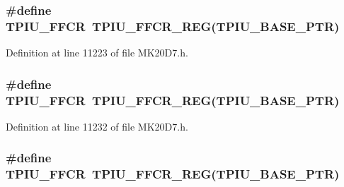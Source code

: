 \subsubsection[{\texorpdfstring{T\+P\+I\+U\+\_\+\+F\+F\+CR}{TPIU_FFCR}}]{\setlength{\rightskip}{0pt plus 5cm}\#define T\+P\+I\+U\+\_\+\+F\+F\+CR~{\bf T\+P\+I\+U\+\_\+\+F\+F\+C\+R\+\_\+\+R\+EG}({\bf T\+P\+I\+U\+\_\+\+B\+A\+S\+E\+\_\+\+P\+TR})}\hypertarget{group___t_p_i_u___register___accessor___macros_gac8a5a5f384ba44b32ca65e20ed86745b}{}\label{group___t_p_i_u___register___accessor___macros_gac8a5a5f384ba44b32ca65e20ed86745b}


Definition at line 11223 of file M\+K20\+D7.\+h.

\subsubsection[{\texorpdfstring{T\+P\+I\+U\+\_\+\+F\+F\+CR}{TPIU_FFCR}}]{\setlength{\rightskip}{0pt plus 5cm}\#define T\+P\+I\+U\+\_\+\+F\+F\+CR~{\bf T\+P\+I\+U\+\_\+\+F\+F\+C\+R\+\_\+\+R\+EG}({\bf T\+P\+I\+U\+\_\+\+B\+A\+S\+E\+\_\+\+P\+TR})}\hypertarget{group___t_p_i_u___register___accessor___macros_gac8a5a5f384ba44b32ca65e20ed86745b}{}\label{group___t_p_i_u___register___accessor___macros_gac8a5a5f384ba44b32ca65e20ed86745b}


Definition at line 11232 of file M\+K20\+D7.\+h.

\subsubsection[{\texorpdfstring{T\+P\+I\+U\+\_\+\+F\+F\+CR}{TPIU_FFCR}}]{\setlength{\rightskip}{0pt plus 5cm}\#define T\+P\+I\+U\+\_\+\+F\+F\+CR~{\bf T\+P\+I\+U\+\_\+\+F\+F\+C\+R\+\_\+\+R\+EG}({\bf T\+P\+I\+U\+\_\+\+B\+A\+S\+E\+\_\+\+P\+TR})}\hypertarget{group___t_p_i_u___register___accessor___macros_gac8a5a5f384ba44b32ca65e20ed86745b}{}\label{group___t_p_i_u___register___accessor___macros_gac8a5a5f384ba44b32ca65e20ed86745b}


